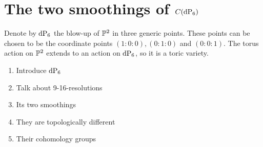 \chapter{The two smoothings of \texorpdfstring{$C(\dP6)$}{C(DP6)}}
\label{sec:twosmoothings}

Denote by $\dP6$ the blow-up of $\P^2$ in three generic points.  These points can be chosen to be the coordinate points $(1:0:0),(0:1:0)$ and $(0:0:1)$. The torus action on $\P^2$ extends to an action on $\dP6$, so it is a toric variety.

\begin{enumerate}
	\item Introduce $\dP6$
	\item Talk about 9-16-resolutions
	\item Its two smoothings
	\item They are topologically different
	\item Their cohomology groups
\end{enumerate}